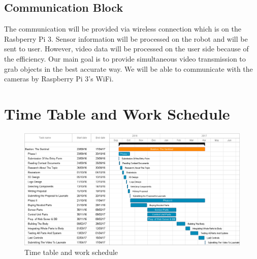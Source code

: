 \documentclass[12pt,a4paper]{article}
\begin{document}
   \subsection{Communication Block}
    \begin{flushleft}
     The communication will be provided via wireless connection which is on the Rasbperry Pi 3. Sensor 
     information will be processed on the robot and will be sent to user. However, video data will be processed on 
     the user side because of the efficiency. Our main goal is to provide simultaneous video transmission to grab 
     objects in the best accurate way. We will be able to communicate with the cameras by Raspberry Pi 3's WiFi.
    \end{flushleft}
 
 \pagebreak
 
 \section{Time Table and Work Schedule}
  \begin{flushleft}
   \begin{figure}[h!]
   \begin{center}
    \includegraphics[scale=0.4]{time_schedule}
    \caption{Time table and work schedule}
   \end{center}
  \end{figure}
  \end{flushleft}
  
\end{document}
